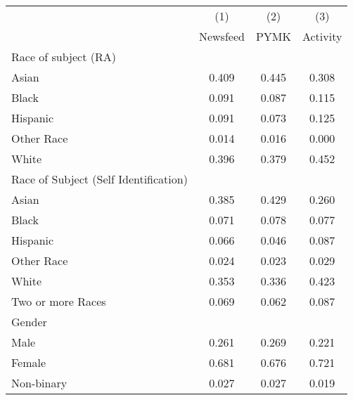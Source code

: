 {
\def\sym#1{\ifmmode^{#1}\else\(^{#1}\)\fi}
\begin{tabular}{l*{3}{c}}
\toprule
                    &\multicolumn{1}{c}{(1)}&\multicolumn{1}{c}{(2)}&\multicolumn{1}{c}{(3)}\\
                    &\multicolumn{1}{c}{Newsfeed}&\multicolumn{1}{c}{PYMK}&\multicolumn{1}{c}{Activity}\\
\midrule
Race of subject (RA)&            &            &            \\
\hspace{3mm} Asian  &       0.409&       0.445&       0.308\\
\hspace{3mm} Black  &       0.091&       0.087&       0.115\\
\hspace{3mm} Hispanic&       0.091&       0.073&       0.125\\
\hspace{3mm} Other Race&       0.014&       0.016&       0.000\\
\hspace{3mm} White  &       0.396&       0.379&       0.452\\
Race of Subject (Self Identification)&            &            &            \\
\hspace{3mm} Asian  &       0.385&       0.429&       0.260\\
\hspace{3mm} Black  &       0.071&       0.078&       0.077\\
\hspace{3mm} Hispanic&       0.066&       0.046&       0.087\\
\hspace{3mm} Other Race&       0.024&       0.023&       0.029\\
\hspace{3mm} White  &       0.353&       0.336&       0.423\\
\hspace{3mm} Two or more Races&       0.069&       0.062&       0.087\\
Gender              &            &            &            \\
 \hspace{3mm} Male  &       0.261&       0.269&       0.221\\
 \hspace{3mm} Female&       0.681&       0.676&       0.721\\
 \hspace{3mm} Non-binary&       0.027&       0.027&       0.019\\

\end{tabular}}
